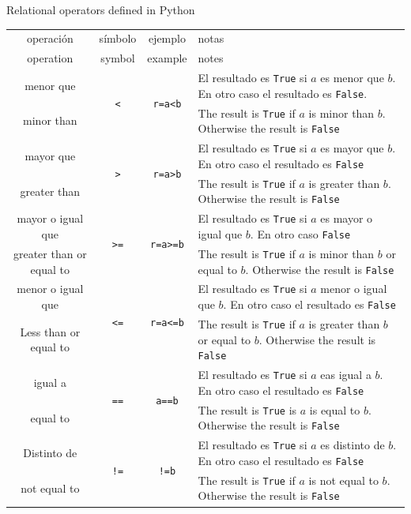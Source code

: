 \begin{table}[h]
{Relational operators defined in Python}\label{tabrel}
\centering
\begin{tabular}{cccm{7cm}}
\hline
\hline
operación&símbolo&ejemplo&notas\\
operation&symbol&example&notes\\
\hline
menor que &\multirow{2}{*}{\texttt{<}}&\multirow{2}{*}{\texttt{r=a<b}}&El resultado es \texttt{True} si $a$ es menor que $b$. En otro caso el resultado es \texttt{False}. \\
minor than &&& The result is \texttt{True} if $a$ is minor than $b$. Otherwise the result is \texttt{False}\\
\hline
mayor que&\multirow{2}{*}{\texttt{>}}&\multirow{2}{*}{\texttt{r=a>b}}& El resultado es \texttt{True} si $a$ es mayor que $b$. En otro caso el resultado es \texttt{False}\\ 
greater than&&& The result is \texttt{True} if $a$ is greater than $b$. Otherwise the result is \texttt{False} \\
\hline
mayor o igual que&\multirow{2}{*}{\texttt{>=}}&\multirow{2}{*}{\texttt{r=a>=b}}&El resultado es \texttt{True} si $a$  es mayor o igual que $b$. En otro caso \texttt{False}\\ 
greater than or equal to&&& The result is \texttt{True} if $a$ is minor than $b$ or equal to $b$. Otherwise the result is \texttt{False}\\
\hline
menor o igual que&\multirow{2}{*}{\texttt{<=}}&\multirow{2}{*}{\texttt{r=a<=b}}&El resultado es \texttt{True} si $a$ menor o igual que $b$. En otro caso el resultado es \texttt{False}\\ 
Less than or equal to&&& The result is \texttt{True} if $a$ is greater than $b$ or equal to $b$. Otherwise the result is \texttt{False}\\
\hline
igual a&\multirow{2}{*}{\texttt{==}}&\multirow{2}{*}{\texttt{a==b}}&El resultado es \texttt{True} si $a$ eas igual a $b$. En otro caso el resultado es \texttt{False}\\ 
equal to &&& The result is \texttt{True} is $a$ is equal to $b$. Otherwise the result is \texttt{False}\\
\hline
Distinto de& \multirow{2}{*}{\texttt{!=}}& \multirow{2}{*}{\texttt{!=b}}&El resultado es \texttt{True} si $a$ es distinto de $b$. En otro caso el resultado es \texttt{False}\\ 
not equal to&&& The result is \texttt{True} if $a$ is not equal to $b$. Otherwise the result is \texttt{False}\\
\hline
\hline
\end{tabular}
\end{table} 

